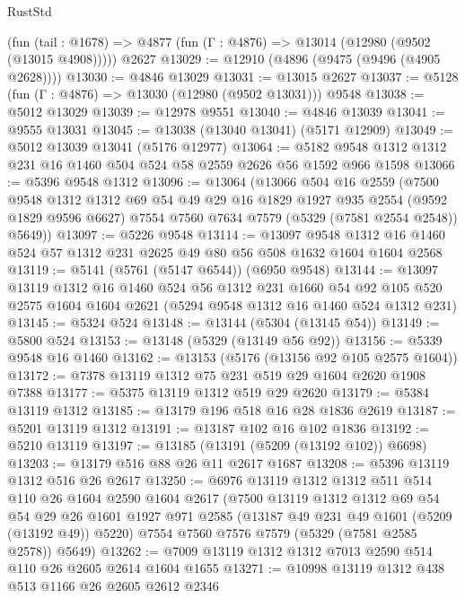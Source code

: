 \begin{lexlean}{RustStd}
\begin{coremodule}
    (fun (tail : @1678) => @4877 (fun (Γ : @4876) => @13014 (@12980 (@9502 (@13015 @4908)))))
    @2627
@13029 := @12910 (@4896 (@9475 (@9496 (@4905 @2628))))
@13030 := @4846 @13029
@13031 := @13015 @2627
@13037 := @5128 (fun (Γ : @4876) => @13030 (@12980 (@9502 @13031))) @9548
@13038 := @5012 @13029
@13039 := @12978 @9551
@13040 := @4846 @13039
@13041 := @9555 @13031
@13045 := @13038 (@13040 @13041) (@5171 @12909)
@13049 := @5012 @13039 @13041 (@5176 @12977)
@13064 := @5182 @9548 @1312 @1312 @231 @16 @1460 @504 @524 @58 @2559 @2626 @56 @1592 @966 @1598
@13066 := @5396 @9548 @1312
@13096 := @13064
    (@13066
      @504
      @16
      @2559
      (@7500
        @9548
        @1312
        @1312
        @69
        @54
        @49
        @29
        @16
        @1829
        @1927
        @935
        @2554
        (@9592 @1829 @9596 @6627)
        @7554
        @7560
        @7634
        @7579
        (@5329 (@7581 @2554 @2548))
        @5649))
@13097 := @5226 @9548
@13114 := @13097
    @9548
    @1312
    @16
    @1460
    @524
    @57
    @1312
    @231
    @2625
    @49
    @80
    @56
    @508
    @1632
    @1604
    @1604
    @2568
@13119 := @5141 (@5761 (@5147 @6544)) (@6950 @9548)
@13144 := @13097
    @13119
    @1312
    @16
    @1460
    @524
    @56
    @1312
    @231
    @1660
    @54
    @92
    @105
    @520
    @2575
    @1604
    @1604
    @2621
    (@5294 @9548 @1312 @16 @1460 @524 @1312 @231)
@13145 := @5324 @524
@13148 := @13144 (@5304 (@13145 @54))
@13149 := @5800 @524
@13153 := @13148 (@5329 (@13149 @56 @92))
@13156 := @5339 @9548 @16 @1460
@13162 := @13153 (@5176 (@13156 @92 @105 @2575 @1604))
@13172 := @7378 @13119 @1312 @75 @231 @519 @29 @1604 @2620 @1908 @7388
@13177 := @5375 @13119 @1312 @519 @29 @2620
@13179 := @5384 @13119 @1312
@13185 := @13179 @196 @518 @16 @28 @1836 @2619
@13187 := @5201 @13119 @1312
@13191 := @13187 @102 @16 @102 @1836
@13192 := @5210 @13119
@13197 := @13185 (@13191 (@5209 (@13192 @102)) @6698)
@13203 := @13179 @516 @88 @26 @11 @2617 @1687
@13208 := @5396 @13119 @1312 @516 @26 @2617
@13250 := @6976
    @13119
    @1312
    @1312
    @511
    @514
    @110
    @26
    @1604
    @2590
    @1604
    @2617
    (@7500
      @13119
      @1312
      @1312
      @69
      @54
      @54
      @29
      @26
      @1601
      @1927
      @971
      @2585
      (@13187 @49 @231 @49 @1601 (@5209 (@13192 @49)) @5220)
      @7554
      @7560
      @7576
      @7579
      (@5329 (@7581 @2585 @2578))
      @5649)
@13262 := @7009 @13119 @1312 @1312 @7013 @2590 @514 @110 @26 @2605 @2614 @1604 @1655
@13271 := @10998 @13119 @1312 @438 @513 @1166 @26 @2605 @2612 @2346

\end{coremodule}
\end{lexlean}
